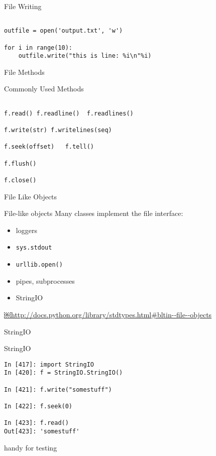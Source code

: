 \documentclass{beamer}
\begin{document}
\begin{frame}[fragile]{File Writing}

\begin{verbatim}

outfile = open('output.txt', 'w')

for i in range(10):
    outfile.write("this is line: %i\n"%i)

\end{verbatim}

\end{frame}

\begin{frame}[fragile]{File Methods}

{\Large Commonly Used Methods}
\begin{verbatim}

f.read() f.readline()  f.readlines() 

f.write(str) f.writelines(seq)
 
f.seek(offset)   f.tell()

f.flush()           
           
f.close() 
\end{verbatim}

\end{frame}

\begin{frame}[fragile]{File Like Objects}

{\Large File-like objects }
\vfill
{\large Many classes implement the file interface:}
\vfill
\begin{itemize}
  \item loggers
  \item \verb|sys.stdout|
  \item \verb|urllib.open()|
  \item pipes, subprocesses
  \item StringIO
\end{itemize}

\url{￼http://docs.python.org/library/stdtypes.html#bltin-­‐file-­‐objects}
\end{frame}

\begin{frame}[fragile]{StringIO}

{\Large StringIO }
\vfill
\begin{verbatim}
In [417]: import StringIO
In [420]: f = StringIO.StringIO()

In [421]: f.write("somestuff")

In [422]: f.seek(0)

In [423]: f.read()
Out[423]: 'somestuff'
\end{verbatim}

{\Large handy for testing}
\end{frame}
\end{document}
